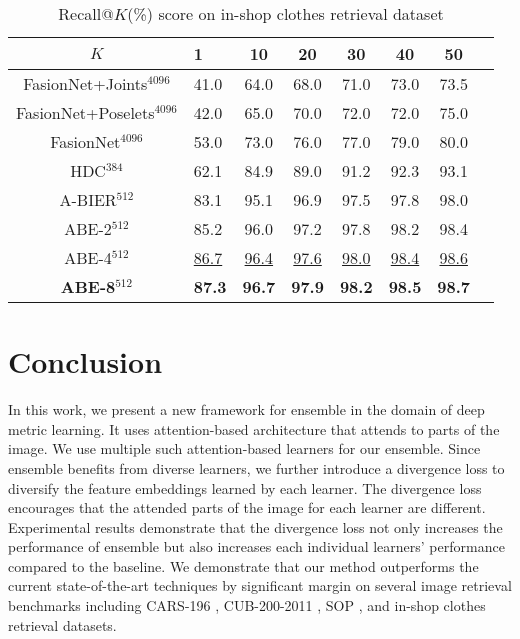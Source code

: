 \documentclass[runningheads]{llncs}
\begin{document}
\setlength{\tabcolsep}{4pt}
\begin{table}
\begin{center}
\caption{Recall@$K$(\%) score on in-shop clothes retrieval dataset}
\vspace{-1mm}
\label{table:inshopcomptable}
\scriptsize
\begin{tabular}{Sl cccccc}
\hline
$K$ & 1 & 10 & 20 & 30 & 40 & 50\\
\hline
FasionNet+Joints$^{4096}$ \cite{liu2016deepfashion} & 41.0 & 64.0 & 68.0 & 71.0 & 73.0 & 73.5  \\
FasionNet+Poselets$^{4096}$ \cite{liu2016deepfashion} & 42.0 & 65.0 & 70.0 & 72.0 & 72.0 & 75.0  \\
FasionNet$^{4096}$ \cite{liu2016deepfashion} & 53.0 & 73.0 & 76.0 & 77.0 & 79.0 & 80.0  \\
HDC$^{384}$ \cite{yuan2016hard} & 62.1 & 84.9 & 89.0 & 91.2 & 92.3 & 93.1  \\
A-BIER$^{512}$ \cite{opitz2018deep} & 83.1 & 95.1 & 96.9 & 97.5 & 97.8 & 98.0  \\
\hline
ABE-2$^{512}$ & 85.2 & 96.0 & 97.2 & 97.8 & 98.2 & 98.4  \\
ABE-4$^{512}$ & \underline{86.7} & \underline{96.4} & \underline{97.6} & \underline{98.0} & \underline{98.4} & \underline{98.6}  \\
\textbf{ABE-8$^{512}$} & \textbf{87.3} & \textbf{96.7} & \textbf{97.9} & \textbf{98.2} & \textbf{98.5} & \textbf{98.7}  \\

\hline
\end{tabular}
\vspace{-2mm}
\end{center}
\end{table}
\setlength{\tabcolsep}{1.4pt}
 
\section{Conclusion}
In this work, we present a new framework for ensemble in the domain of deep metric learning.
It uses attention-based architecture that attends to parts of the image.
We use multiple such attention-based learners for our ensemble.
Since ensemble benefits from diverse learners,
we further introduce a divergence loss to diversify the feature embeddings learned by each learner.
The divergence loss encourages that the attended parts of the image for each learner are different.
Experimental results demonstrate that the divergence loss not only increases the performance of ensemble
but also increases each individual learners' performance compared to the baseline.
We demonstrate that our method outperforms the current state-of-the-art techniques by significant margin
on several image retrieval benchmarks including CARS-196 \cite{KrauseStarkDengFei-Fei_3DRR2013},
CUB-200-2011 \cite{WahCUB_200_2011}, SOP \cite{oh2016deep}, and in-shop clothes retrieval \cite{liu2016deepfashion} datasets.
 
\end{document}

